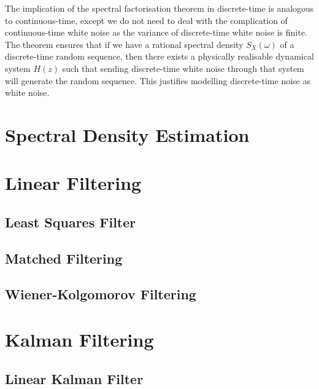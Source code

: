 \documentclass[11pt]{report} %
\begin{document}
The implication of the spectral factorisation theorem in discrete-time is analogous to continuous-time, except we do not need to deal with the complication of continuous-time white noise as the variance of discrete-time white noise is finite. The theorem ensures that if we have a rational spectral density $S_{X}\left(\omega\right)$ of a discrete-time random sequence, then there exists a physically realisable dynamical system $H\left(z\right)$ such that sending discrete-time white noise through that system will generate the random sequence. This justifies modelling discrete-time noise as white noise.

\section{Spectral Density Estimation}

\section{Linear Filtering}

\subsection{Least Squares Filter}

\subsection{Matched Filtering}

\subsection{Wiener-Kolgomorov Filtering}

\section{Kalman Filtering}

\subsection{Linear Kalman Filter}
\end{document}
